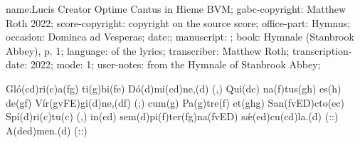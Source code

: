 name:Lucis Creator Optime Cantus in Hieme BVM;
gabc-copyright: Matthew Roth 2022;
score-copyright: copyright on the source score;
office-part: Hymnus;
occasion: Dominca ad Vesperas;
date:;
manuscript: ;
book: Hymnale (Stanbrook Abbey), p. 1;
language: of the lyrics;
transcriber: Matthew Roth;
transcription-date: 2022;
mode: 1;
user-notes: from the Hymnale of Stanbrook Abbey;

Gló(cd)ri(c)a(fg) ti(g)bi(fe) Dó(d)mi(cd)ne,(d) (,) Qui(dc) na(f)tus(gh) es(h) de(gf) Vír(gvFE)gi(d)ne,(df) (;) cum(g) Pa(g)tre(f) et(ghg) San(fvED)cto(ec) Spí(d)ri(c)tu(c)  (,) in(cd) sem(d)pi(f)ter(fg)na(fvED) sǽ(ed)cu(cd)la.(d) (::) A(ded)men.(d) (::)